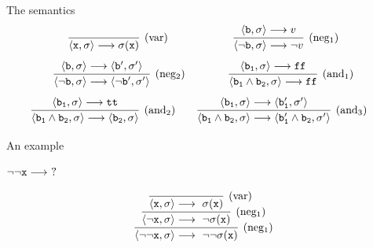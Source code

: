 \documentclass{beamer}
\begin{document}
\begin{frame}{The semantics}
        \[
                \infer[(\text{var})]{\langle \mathtt{x}, \sigma \rangle 
                \longrightarrow \sigma(\mathtt{x})}{} \qquad \qquad
                \qquad
                \infer[(\text{neg$_1$})]{\langle \neg \prog{b}, \sigma \rangle 
                \longrightarrow \neg v}{
                   \pv{\prog{b}}{\sigma} \longrightarrow
                   v
                }
        \] 
        \pause
        \vspace{0.2cm}        
        \[
                \infer[(\text{neg$_2$})]{
                \pv{\neg \prog{b}}{\sigma} 
                \longrightarrow \pv{\neg \prog{b'}}{\sigma'}
                }{
                \pv{\prog{b}}{\sigma} 
                \longrightarrow \pv{\prog{b'}}{\sigma'}
                } \qquad \qquad
                \infer[(\text{and$_1$})]{
                        \pv{\prog{b_1} \wedge \prog{b_2} }{\sigma}
                \longrightarrow \prog{ff}}{
                   \pv{\prog{b_1}}{\sigma} \longrightarrow
                   \prog{ff}
                }
        \] 
        \pause
        \vspace{0.2cm}
        \[
                \hspace{-0.3cm}
                \infer[(\text{and$_2$})]{
                \pv{ \prog{b_1} \wedge \prog{b_2} }{ \sigma }
                \longrightarrow 
                \pv{ \prog{b_2} }{\sigma}  }
                {
                   \pv{\prog{b_1}}{\sigma} \longrightarrow
                   \prog{tt}
                }
                \qquad 
                \infer[(\text{and$_3$})]{
                        \pv{\prog{b_1} \wedge \prog{b_2} }{\sigma}
                \longrightarrow \pv{\prog{b_1'} \wedge \prog{b_2}}{\sigma'} }{
                   \pv{\prog{b_1}}{\sigma} \longrightarrow
                   \pv{\prog{b_1'}}{\sigma'}
                }
        \] 
        \vfill
\end{frame}

\begin{frame}{An example}

        $\neg \neg \mathtt{x} \longrightarrow\ ?$

        \centering
        \[
                \infer[(\text{neg$_1$})]{
                        \pv{\neg \neg \prog{x}}{\sigma}
                        \longrightarrow\ \neg \neg \sigma(\prog{x})
                }{
                        \infer[(\text{neg$_1$})]{
                                \pv{\neg \prog{x}}{\sigma}
                                \longrightarrow\ \neg \sigma(\prog{x})
                        }{
                                \infer[(\text{var})]{ 
                                \pv{\prog{x}}{\sigma} \longrightarrow\  \sigma(\prog{x})
                                }{
                                }
                        }
                }
        \]
\end{frame}
\end{document}
